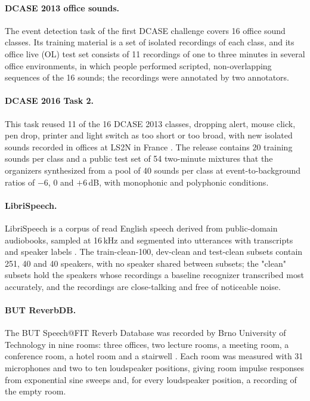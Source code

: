 \documentclass[11pt]{article}
\begin{document}
\paragraph{DCASE 2013 office sounds.} The event detection task of the first DCASE challenge \citep{stowell2015dcase} covers 16 office sound classes. Its training material is a set of isolated recordings of each class, and its office live (OL) test set consists of 11 recordings of one to three minutes in several office environments, in which people performed scripted, non-overlapping sequences of the 16 sounds; the recordings were annotated by two annotators.

\paragraph{DCASE 2016 Task 2.} This task reused 11 of the 16 DCASE 2013 classes, dropping alert, mouse click, pen drop, printer and light switch as too short or too broad, with new isolated sounds recorded in offices at LS2N in France \citep{lafay2017dcase2016}. The release contains 20 training sounds per class and a public test set of 54 two-minute mixtures that the organizers synthesized from a pool of 40 sounds per class at event-to-background ratios of $-6$, 0 and $+6$\,dB, with monophonic and polyphonic conditions.

\paragraph{LibriSpeech.} LibriSpeech is a corpus of read English speech derived from public-domain audiobooks, sampled at 16\,kHz and segmented into utterances with transcripts and speaker labels \citep{panayotov2015librispeech}. The train-clean-100, dev-clean and test-clean subsets contain 251, 40 and 40 speakers, with no speaker shared between subsets; the "clean" subsets hold the speakers whose recordings a baseline recognizer transcribed most accurately, and the recordings are close-talking and free of noticeable noise.

\paragraph{BUT ReverbDB.} The BUT Speech@FIT Reverb Database was recorded by Brno University of Technology in nine rooms: three offices, two lecture rooms, a meeting room, a conference room, a hotel room and a stairwell \citep{szoke2019but}. Each room was measured with 31 microphones and two to ten loudspeaker positions, giving room impulse responses from exponential sine sweeps and, for every loudspeaker position, a recording of the empty room.
\end{document}
